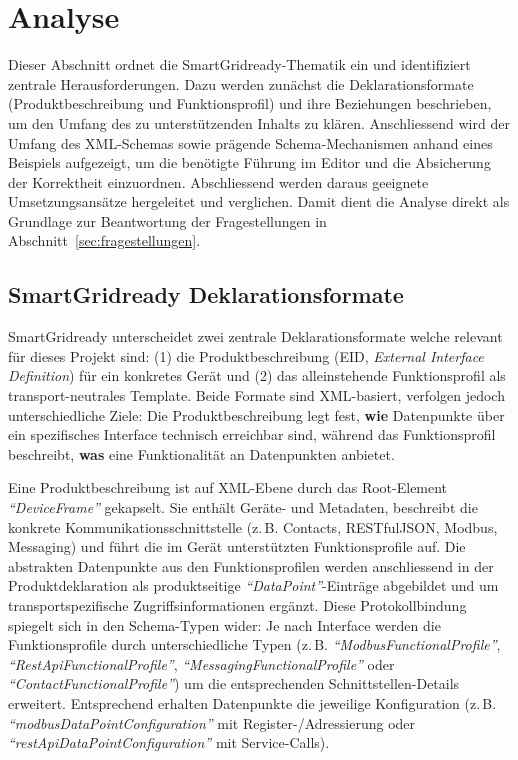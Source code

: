 \documentclass[a4paper,12pt]{article}
\newcommand{\xmlelement}[1]{\textit{``#1''}}
\begin{document}
\section{Analyse}
\label{sec:analyse}

Dieser Abschnitt ordnet die SmartGridready-Thematik ein und identifiziert zentrale Herausforderungen. Dazu werden 
zunächst die Deklarationsformate (Produktbeschreibung und Funktionsprofil) und ihre Beziehungen beschrieben, um 
den Umfang des zu unterstützenden Inhalts zu klären. Anschliessend wird der Umfang des XML-Schemas sowie prägende 
Schema-Mechanismen anhand eines Beispiels aufgezeigt, um die benötigte Führung im Editor und die Absicherung der 
Korrektheit einzuordnen. Abschliessend werden daraus geeignete Umsetzungsansätze hergeleitet und verglichen.
Damit dient die Analyse direkt als Grundlage zur Beantwortung der Fragestellungen in Abschnitt~\ref{sec:fragestellungen}.

\subsection{SmartGridready Deklarationsformate}
\label{sec:smartgridready-deklarationsformate}

SmartGridready unterscheidet zwei zentrale Deklarationsformate welche relevant für dieses Projekt sind: (1) die 
Produktbeschreibung (EID, \textit{External Interface Definition}) für ein konkretes Gerät und (2) das alleinstehende 
Funktionsprofil als transport-neutrales Template. Beide Formate sind XML-basiert, verfolgen jedoch unterschiedliche 
Ziele: Die Produktbeschreibung legt fest, \textbf{wie} Datenpunkte über ein spezifisches Interface technisch 
erreichbar sind, während das Funktionsprofil beschreibt, \textbf{was} eine Funktionalität an Datenpunkten anbietet.

Eine Produktbeschreibung ist auf XML-Ebene durch das Root-Element \xmlelement{DeviceFrame} gekapselt. Sie enthält 
Geräte- und Metadaten, beschreibt die konkrete Kommunikationsschnittstelle (z.\,B. Contacts, RESTfulJSON, Modbus, 
Messaging) und führt die im Gerät unterstützten Funktionsprofile auf. Die abstrakten Datenpunkte aus den 
Funktionsprofilen werden anschliessend in der Produktdeklaration als produktseitige \xmlelement{DataPoint}-Einträge 
abgebildet und um transportspezifische Zugriffsinformationen ergänzt. Diese Protokollbindung spiegelt sich in den 
Schema-Typen wider: Je nach Interface werden die Funktionsprofile durch unterschiedliche Typen 
(z.\,B. \xmlelement{ModbusFunctionalProfile}, \xmlelement{RestApiFunctionalProfile}, 
\xmlelement{MessagingFunctionalProfile} oder \xmlelement{ContactFunctionalProfile}) um die entsprechenden 
Schnittstellen-Details erweitert. Entsprechend erhalten Datenpunkte die jeweilige Konfiguration 
(z.\,B. \xmlelement{modbusDataPointConfiguration} mit Register-/Adressierung oder 
\xmlelement{restApiDataPointConfiguration} mit Service-Calls).
\end{document}

